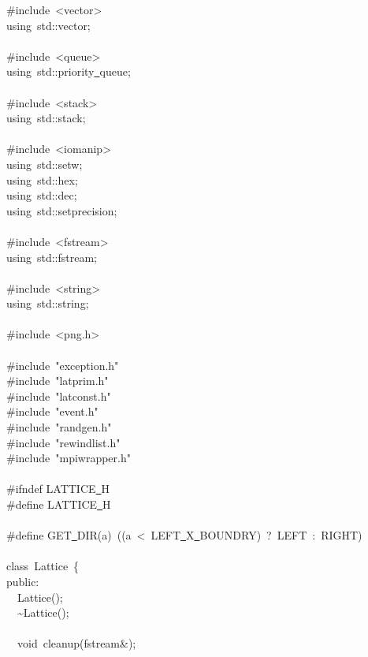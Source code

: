 {\ttfamily \raggedright \small
\#include\ <{}vector>{}\\
using\ std::vector;\\
\ \\
\#include\ <{}queue>{}\\
using\ std::priority\underline\ queue;\\
\ \\
\#include\ <{}stack>{}\\
using\ std::stack;\\
\ \\
\#include\ <{}iomanip>{}\\
using\ std::setw;\\
using\ std::hex;\\
using\ std::dec;\\
using\ std::setprecision;\\
\ \\
\#include\ <{}fstream>{}\\
using\ std::fstream;\\
\ \\
\#include\ <{}string>{}\\
using\ std::string;\\
\ \\
\#include\ <{}png.h>{}\\
\ \\
\#include\ "{}exception.h"{}\\
\#include\ "{}latprim.h"{}\\
\#include\ "{}latconst.h"{}\\
\#include\ "{}event.h"{}\\
\#include\ "{}randgen.h"{}\\
\#include\ "{}rewindlist.h"{}\\
\#include\ "{}mpiwrapper.h"{}\\
\ \\
\#ifndef LATTICE\underline\ H\\
\#define LATTICE\underline\ H\\
\ \\
\#define GET\underline\ DIR(a)\ ((a\ <{}\ LEFT\underline\ X\underline\ BOUNDRY)\ ?\ LEFT\ :\ RIGHT)\\
\ \\
class\ Lattice\ \{\\
public:\\
\ \ Lattice();\\
\ \ \textasciitilde Lattice();\\
\ \\
\ \ void\ cleanup(fstream\&);\\
}
